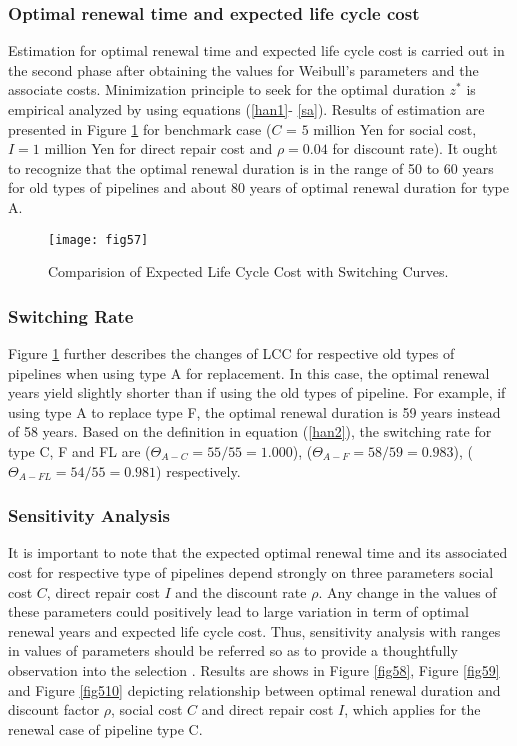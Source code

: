 \subsubsection{Optimal renewal time and expected life cycle cost}
\label{5822}
Estimation for optimal renewal time and expected life cycle cost is carried out in the second phase after obtaining the values for Weibull's parameters and the associate costs. Minimization principle to seek for the optimal duration $z^*$ is empirical analyzed by using equations (\ref{han1}- \ref{sa}). Results of estimation are presented in Figure \ref{fig57} for benchmark case ($C$ = $5$ million Yen for social cost, $I=1$ million Yen for direct repair cost and $\rho=0.04$ for discount rate). It ought to recognize that the optimal renewal duration is in the range of 50 to 60 years for old types of pipelines and about 80 years of optimal renewal duration for type A.
\begin{figure}[t]
\begin{center}
\texttt{[image: fig57]} 
\end{center}
\caption{Comparision of Expected Life Cycle Cost with Switching Curves.}
\label{fig57} 
\end{figure}
\subsubsection{Switching Rate}
\label{5823}
Figure \ref{fig57} further describes the changes of LCC for respective old types of pipelines when using type A for replacement. In this case, the optimal renewal years yield slightly shorter than if using the old types of pipeline. For example, if using type A to replace type F, the optimal renewal duration is 59 years instead of 58 years. Based on the definition in equation (\ref{han2}), the switching rate for type C, F and FL are ($\Theta_{A-C}=55/55=1.000$), ($\Theta_{A-F}=58/59=0.983$), ($\Theta_{A-FL}=54/55=0.981$) respectively.
\subsubsection{Sensitivity Analysis}
\label{5824}
It is important to note that the expected optimal renewal time and its associated cost for respective type of pipelines depend strongly on three parameters social cost $C$, direct repair cost $I$ and the discount rate $\rho$. Any change in the values of these parameters could positively lead to large variation in term of optimal renewal years and expected life cycle cost. Thus, sensitivity analysis with ranges in values of parameters should be referred so as to provide a thoughtfully observation into the selection \cite{senanalysis}. Results are shows in Figure \ref{fig58}, Figure \ref{fig59} and Figure \ref{fig510} depicting relationship between optimal renewal duration and discount factor $\rho$, social cost $C$ and direct repair cost $I$, which applies for the renewal case of pipeline type C.

